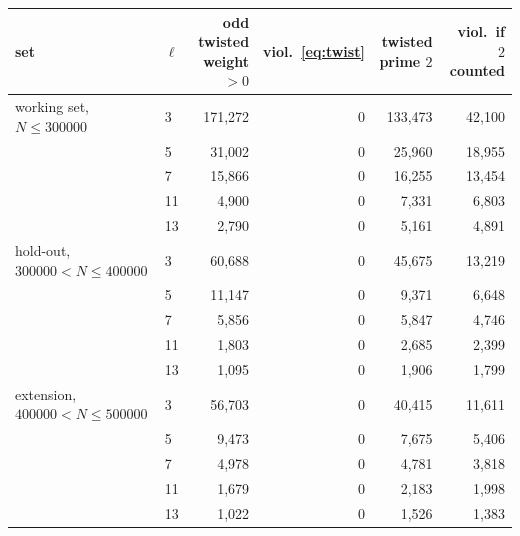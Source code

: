 \begin{tabular}{llrrrr}
\hline
set & $\ell$ & odd twisted weight $>0$ & viol.\ \eqref{eq:twist} & twisted prime $2$ & viol.\ if $2$ counted \\
\hline
working set, $N \le 300000$ & 3 & 171,272 & 0 & 133,473 & 42,100 \\
 & 5 & 31,002 & 0 & 25,960 & 18,955 \\
 & 7 & 15,866 & 0 & 16,255 & 13,454 \\
 & 11 & 4,900 & 0 & 7,331 & 6,803 \\
 & 13 & 2,790 & 0 & 5,161 & 4,891 \\
\hline
hold-out, $300000 < N \le 400000$ & 3 & 60,688 & 0 & 45,675 & 13,219 \\
 & 5 & 11,147 & 0 & 9,371 & 6,648 \\
 & 7 & 5,856 & 0 & 5,847 & 4,746 \\
 & 11 & 1,803 & 0 & 2,685 & 2,399 \\
 & 13 & 1,095 & 0 & 1,906 & 1,799 \\
\hline
extension, $400000 < N \le 500000$ & 3 & 56,703 & 0 & 40,415 & 11,611 \\
 & 5 & 9,473 & 0 & 7,675 & 5,406 \\
 & 7 & 4,978 & 0 & 4,781 & 3,818 \\
 & 11 & 1,679 & 0 & 2,183 & 1,998 \\
 & 13 & 1,022 & 0 & 1,526 & 1,383 \\
\hline
\end{tabular}

